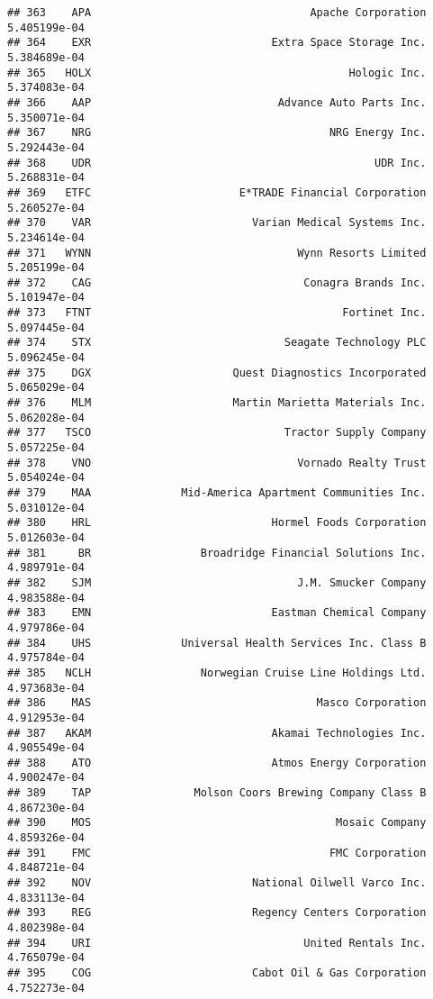 \documentclass[
]{article}
\begin{document}
\begin{verbatim}
## 363    APA                                  Apache Corporation 5.405199e-04
## 364    EXR                            Extra Space Storage Inc. 5.384689e-04
## 365   HOLX                                        Hologic Inc. 5.374083e-04
## 366    AAP                             Advance Auto Parts Inc. 5.350071e-04
## 367    NRG                                     NRG Energy Inc. 5.292443e-04
## 368    UDR                                            UDR Inc. 5.268831e-04
## 369   ETFC                       E*TRADE Financial Corporation 5.260527e-04
## 370    VAR                         Varian Medical Systems Inc. 5.234614e-04
## 371   WYNN                                Wynn Resorts Limited 5.205199e-04
## 372    CAG                                 Conagra Brands Inc. 5.101947e-04
## 373   FTNT                                       Fortinet Inc. 5.097445e-04
## 374    STX                              Seagate Technology PLC 5.096245e-04
## 375    DGX                      Quest Diagnostics Incorporated 5.065029e-04
## 376    MLM                      Martin Marietta Materials Inc. 5.062028e-04
## 377   TSCO                              Tractor Supply Company 5.057225e-04
## 378    VNO                                Vornado Realty Trust 5.054024e-04
## 379    MAA              Mid-America Apartment Communities Inc. 5.031012e-04
## 380    HRL                            Hormel Foods Corporation 5.012603e-04
## 381     BR                 Broadridge Financial Solutions Inc. 4.989791e-04
## 382    SJM                                J.M. Smucker Company 4.983588e-04
## 383    EMN                            Eastman Chemical Company 4.979786e-04
## 384    UHS              Universal Health Services Inc. Class B 4.975784e-04
## 385   NCLH                 Norwegian Cruise Line Holdings Ltd. 4.973683e-04
## 386    MAS                                   Masco Corporation 4.912953e-04
## 387   AKAM                            Akamai Technologies Inc. 4.905549e-04
## 388    ATO                            Atmos Energy Corporation 4.900247e-04
## 389    TAP                Molson Coors Brewing Company Class B 4.867230e-04
## 390    MOS                                      Mosaic Company 4.859326e-04
## 391    FMC                                     FMC Corporation 4.848721e-04
## 392    NOV                         National Oilwell Varco Inc. 4.833113e-04
## 393    REG                         Regency Centers Corporation 4.802398e-04
## 394    URI                                 United Rentals Inc. 4.765079e-04
## 395    COG                         Cabot Oil & Gas Corporation 4.752273e-04

\end{verbatim}
\end{document}
